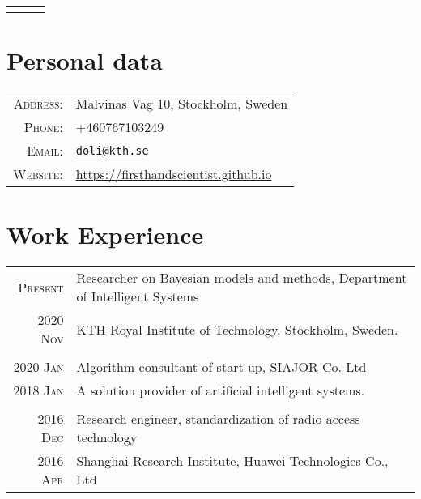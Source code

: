 \documentclass[a4paper,10pt]{article}
\begin{document}
\pagestyle{empty}


\begin{center}
  \begin{tabular}{lcr}
    \par{\centering{\Huge Dong Liu, Ph.D.}\bigskip\par} & & %
  \end{tabular}
\end{center}

\section{Personal data}

\begin{tabular}{rl}
  \textsc{Address:} & Malvinas Vag 10, Stockholm, Sweden \\
  \textsc{Phone:} & +460767103249 \\
  \textsc{Email:} & \href{mailto:doli@kth.se}{\nolinkurl{doli@kth.se}} \\
  \textsc{Website:} & \href{https://firsthandscientist.github.io}{https://firsthandscientist.github.io}\\
\end{tabular}


\section{Work Experience}
\begin{tabular}{r|p{13cm}}
  \textsc{Present}  & Researcher on Bayesian models and methods, Department of Intelligent Systems \\
  \textsc{2020 Nov}  & KTH Royal Institute of Technology, Stockholm, Sweden.\\
  \multicolumn{2}{c}{} \\

  \textsc{2020 Jan}  & Algorithm consultant of start-up, \href{http://www.siajor.com/}{SIAJOR} Co. Ltd \\
  \textsc{2018 Jan}  & A solution provider of artificial intelligent systems. \\
  \multicolumn{2}{c}{} \\

  \textsc{2016 Dec}  & Research engineer, standardization of radio access technology  \\
  \textsc{2016 Apr}  & Shanghai Research Institute, Huawei Technologies Co., Ltd \\
\end{tabular}
\end{document}

